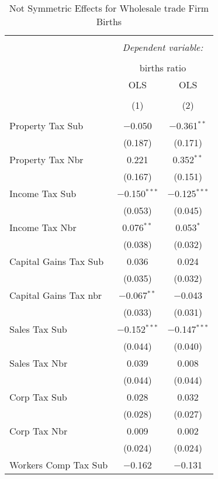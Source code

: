 
\begin{table}[!htbp] \centering 
  \caption{Not Symmetric Effects for  Wholesale trade Firm Births} 
  \label{42noequality} 
\begin{tabular}{@{\extracolsep{5pt}}lcc} 
\\[-1.8ex]\hline 
\hline \\[-1.8ex] 
 & \multicolumn{2}{c}{\textit{Dependent variable:}} \\ 
\cline{2-3} 
\\[-1.8ex] & \multicolumn{2}{c}{births ratio} \\ 
 & OLS & OLS \\ 
\\[-1.8ex] & (1) & (2)\\ 
\hline \\[-1.8ex] 
 Property Tax Sub & $-$0.050 & $-$0.361$^{**}$ \\ 
  & (0.187) & (0.171) \\ 
  Property Tax Nbr & 0.221 & 0.352$^{**}$ \\ 
  & (0.167) & (0.151) \\ 
  Income Tax Sub & $-$0.150$^{***}$ & $-$0.125$^{***}$ \\ 
  & (0.053) & (0.045) \\ 
  Income Tax Nbr & 0.076$^{**}$ & 0.053$^{*}$ \\ 
  & (0.038) & (0.032) \\ 
  Capital Gains Tax Sub & 0.036 & 0.024 \\ 
  & (0.035) & (0.032) \\ 
  Capital Gains Tax nbr & $-$0.067$^{**}$ & $-$0.043 \\ 
  & (0.033) & (0.031) \\ 
  Sales Tax Sub & $-$0.152$^{***}$ & $-$0.147$^{***}$ \\ 
  & (0.044) & (0.040) \\ 
  Sales Tax Nbr & 0.039 & 0.008 \\ 
  & (0.044) & (0.044) \\ 
  Corp Tax Sub & 0.028 & 0.032 \\ 
  & (0.028) & (0.027) \\ 
  Corp Tax Nbr & 0.009 & 0.002 \\ 
  & (0.024) & (0.024) \\ 
  Workers Comp Tax Sub & $-$0.162 & $-$0.131 \\ 

\end{tabular}
\end{table}
